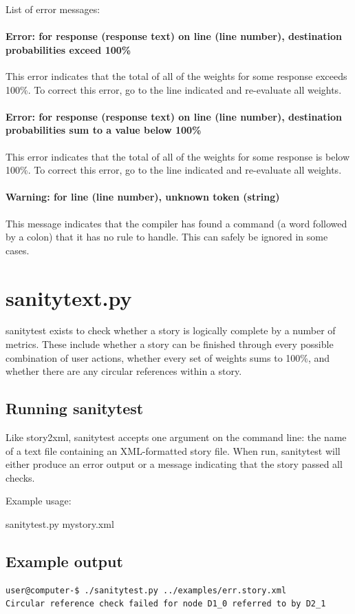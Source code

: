 \documentclass[12pt,letterpaper]{article}
\begin{document}
 List of error messages:
 \paragraph{Error: for response (response text) on line (line number), destination probabilities exceed 100\%}
 This error indicates that the total of all of the weights for some response exceeds 100\%. To correct this error, go to the line indicated and re-evaluate all weights.
 \paragraph{Error: for response (response text) on line (line number), destination probabilities sum to a value below 100\%}
 This error indicates that the total of all of the weights for some response is below 100\%. To correct this error, go to the line indicated and re-evaluate all weights.
 \paragraph{Warning: for line (line number), unknown token (string)}
 This message indicates that the compiler has found a command (a word followed by a colon) that it has no rule to handle. This can safely be ignored in some cases.
 
 \section{sanitytext.py}
 sanitytest exists to check whether a story is logically complete by a number of metrics. These include whether a story can be finished through every possible
 combination of user actions, whether every set of weights sums to 100\%, and whether there are any circular references within a story. 
 
 \subsection{Running sanitytest}
 Like story2xml, sanitytest accepts one argument on the command line: the name of a text file containing an XML-formatted story file.
 When run, sanitytest will either produce an error output or a message indicating that the story passed all checks.
 
 Example usage:
 \begin{center}
 sanitytest.py mystory.xml
 \end{center}
 
 \subsection{Example output}
 \begin{lstlisting}[breaklines=true]
user@computer-$ ./sanitytest.py ../examples/err.story.xml
Circular reference check failed for node D1_0 referred to by D2_1
 \end{lstlisting}
 
\end{document}
